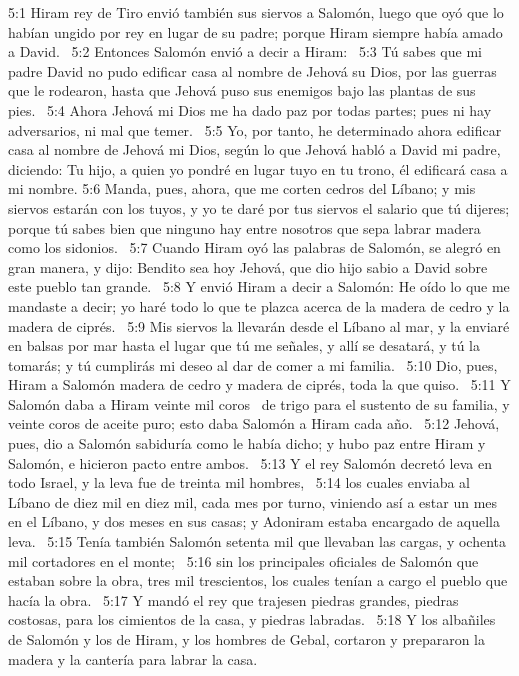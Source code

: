 5:1 Hiram rey de Tiro envió también sus siervos a Salomón, luego que oyó que lo habían ungido por rey en lugar de su padre; porque Hiram siempre había amado a David.  
5:2 Entonces Salomón envió a decir a Hiram:  
5:3 Tú sabes que mi padre David no pudo edificar casa al nombre de Jehová su Dios, por las guerras que le rodearon, hasta que Jehová puso sus enemigos bajo las plantas de sus pies.  
5:4 Ahora Jehová mi Dios me ha dado paz por todas partes; pues ni hay adversarios, ni mal que temer.  
5:5 Yo, por tanto, he determinado ahora edificar casa al nombre de Jehová mi Dios, según lo que Jehová habló a David mi padre, diciendo: Tu hijo, a quien yo pondré en lugar tuyo en tu trono, él edificará casa a mi nombre. 
5:6 Manda, pues, ahora, que me corten cedros del Líbano; y mis siervos estarán con los tuyos, y yo te daré por tus siervos el salario que tú dijeres; porque tú sabes bien que ninguno hay entre nosotros que sepa labrar madera como los sidonios.  
5:7 Cuando Hiram oyó las palabras de Salomón, se alegró en gran manera, y dijo: Bendito sea hoy Jehová, que dio hijo sabio a David sobre este pueblo tan grande.  
5:8 Y envió Hiram a decir a Salomón: He oído lo que me mandaste a decir; yo haré todo lo que te plazca acerca de la madera de cedro y la madera de ciprés.  
5:9 Mis siervos la llevarán desde el Líbano al mar, y la enviaré en balsas por mar hasta el lugar que tú me señales, y allí se desatará, y tú la tomarás; y tú cumplirás mi deseo al dar de comer a mi familia.  
5:10 Dio, pues, Hiram a Salomón madera de cedro y madera de ciprés, toda la que quiso.  
5:11 Y Salomón daba a Hiram veinte mil coros  de trigo para el sustento de su familia, y veinte coros de aceite puro; esto daba Salomón a Hiram cada año.  
5:12 Jehová, pues, dio a Salomón sabiduría como le había dicho; y hubo paz entre Hiram y Salomón, e hicieron pacto entre ambos.  
5:13 Y el rey Salomón decretó leva en todo Israel, y la leva fue de treinta mil hombres,  
5:14 los cuales enviaba al Líbano de diez mil en diez mil, cada mes por turno, viniendo así a estar un mes en el Líbano, y dos meses en sus casas; y Adoniram estaba encargado de aquella leva.  
5:15 Tenía también Salomón setenta mil que llevaban las cargas, y ochenta mil cortadores en el monte;  
5:16 sin los principales oficiales de Salomón que estaban sobre la obra, tres mil trescientos, los cuales tenían a cargo el pueblo que hacía la obra.  
5:17 Y mandó el rey que trajesen piedras grandes, piedras costosas, para los cimientos de la casa, y piedras labradas.  
5:18 Y los albañiles de Salomón y los de Hiram, y los hombres de Gebal, cortaron y prepararon la madera y la cantería para labrar la casa.  
